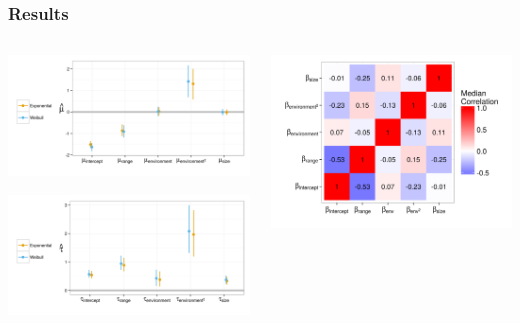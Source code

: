 \documentclass{beamer}
\begin{document}
\begin{frame}
  \frametitle{Results}
 
  \begin{columns}
    \begin{column}{0.5\textwidth}
      \includegraphics[width=\textwidth,keepaspectratio=true]{figure/coef_means}

      \includegraphics[width=\textwidth,keepaspectratio=true]{figure/coef_var}
    \end{column}
    \begin{column}{0.5\textwidth}
      \includegraphics[width=\textwidth,keepaspectratio=true]{figure/wei_cor_heatmap}
    \end{column}
  \end{columns}
\end{frame}
\end{document}
